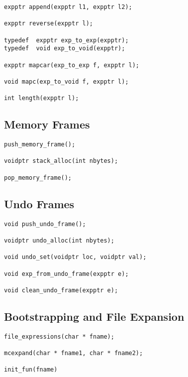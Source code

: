 \documentclass{article}
\begin{document}
\begin{verbatim}
expptr append(expptr l1, expptr l2);

expptr reverse(expptr l);

typedef  expptr exp_to_exp(expptr);
typedef  void exp_to_void(expptr);

expptr mapcar(exp_to_exp f, expptr l);

void mapc(exp_to_void f, expptr l);

int length(expptr l);
\end{verbatim}

\subsection{Memory Frames}

\begin{verbatim}
push_memory_frame();

voidptr stack_alloc(int nbytes);

pop_memory_frame();
\end{verbatim}

\subsection{Undo Frames}

\begin{verbatim}
void push_undo_frame();

voidptr undo_alloc(int nbytes);

void undo_set(voidptr loc, voidptr val);

void exp_from_undo_frame(expptr e);

void clean_undo_frame(expptr e);
\end{verbatim}

\subsection{Bootstrapping and File Expansion}

\begin{verbatim}
file_expressions(char * fname);

mcexpand(char * fname1, char * fname2);

init_fun(fname)
\end{verbatim}




\end{document}
